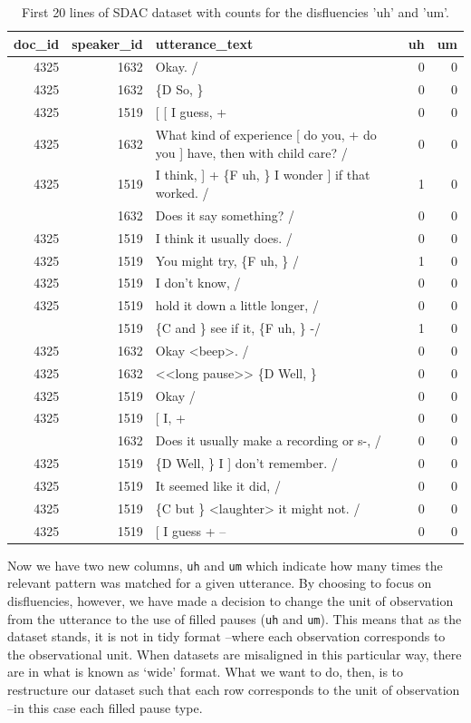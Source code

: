 \documentclass[
]{article}
\begin{document}
\begin{table}

\caption{\label{tab:td-sdac-count-disfluencies-show}First 20 lines of SDAC dataset with counts for the disfluencies 'uh' and 'um'.}
\centering
\begin{tabular}[t]{rrlrr}
\toprule
doc\_id & speaker\_id & utterance\_text & uh & um\\
\midrule
4325 & 1632 & Okay.  / & 0 & 0\\
4325 & 1632 & \{D So, \} & 0 & 0\\
4325 & 1519 & {}[ [ I guess, + & 0 & 0\\
4325 & 1632 & What kind of experience [ do you, + do you ] have, then with child care? / & 0 & 0\\
4325 & 1519 & I think, ] + \{F uh, \} I wonder ] if that worked. / & 1 & 0\\
\addlinespace
4325 & 1632 & Does it say something? / & 0 & 0\\
4325 & 1519 & I think it usually does.  / & 0 & 0\\
4325 & 1519 & You might try, \{F uh, \}  / & 1 & 0\\
4325 & 1519 & I don't know,  / & 0 & 0\\
4325 & 1519 & hold it down a little longer,  / & 0 & 0\\
\addlinespace
4325 & 1519 & \{C and \} see if it, \{F uh, \} -/ & 1 & 0\\
4325 & 1632 & Okay <beep>.  / & 0 & 0\\
4325 & 1632 & <<long pause>> \{D Well, \} & 0 & 0\\
4325 & 1519 & Okay  / & 0 & 0\\
4325 & 1519 & {}[ I, + & 0 & 0\\
\addlinespace
4325 & 1632 & Does it usually make a recording or s-, / & 0 & 0\\
4325 & 1519 & \{D Well, \} I ] don't remember.  / & 0 & 0\\
4325 & 1519 & It seemed like it did,  / & 0 & 0\\
4325 & 1519 & \{C but \} <laughter> it might not.  / & 0 & 0\\
4325 & 1519 & {}[ I guess + -- & 0 & 0\\
\bottomrule
\end{tabular}
\end{table}

Now we have two new columns, \texttt{uh} and \texttt{um} which indicate how many times the relevant pattern was matched for a given utterance. By choosing to focus on disfluencies, however, we have made a decision to change the unit of observation from the utterance to the use of filled pauses (\texttt{uh} and \texttt{um}). This means that as the dataset stands, it is not in tidy format --where each observation corresponds to the observational unit. When datasets are misaligned in this particular way, there are in what is known as `wide' format. What we want to do, then, is to restructure our dataset such that each row corresponds to the unit of observation --in this case each filled pause type.
\end{document}
